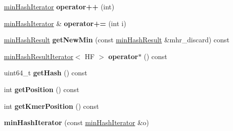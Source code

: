 \begin{DoxyCompactItemize}
\hyperlink{classminHashIterator}{min\+Hash\+Iterator} {\bfseries operator++} (int)
\item 
\mbox{\label{classminHashIterator_a27ab44b8b3ac352f5fca68e45234fa7c}} 
\hyperlink{classminHashIterator}{min\+Hash\+Iterator} \& {\bfseries operator+=} (int i)
\item 
\mbox{\label{classminHashIterator_af6011fc1ea46a7fe78b4962c9115bda4}} 
\hyperlink{structminHashResult}{min\+Hash\+Result} {\bfseries get\+New\+Min} (const \hyperlink{structminHashResult}{min\+Hash\+Result} \&mhr\+\_\+discard) const
\item 
\mbox{\label{classminHashIterator_a7084bf0158bdc1845c76edcf6bb39011}} 
\hyperlink{structminHashResultIterator}{min\+Hash\+Result\+Iterator}$<$ HF $>$ {\bfseries operator$\ast$} () const
\item 
\mbox{\label{classminHashIterator_a5c7fb3a1055ac579f705af1c690ea3f2}} 
uint64\+\_\+t {\bfseries get\+Hash} () const
\item 
\mbox{\label{classminHashIterator_a9e9471805982ccd06ba763ccba86dcb8}} 
int {\bfseries get\+Position} () const
\item 
\mbox{\label{classminHashIterator_a6c422b376378d429bbc45d2e9d5b43c9}} 
int {\bfseries get\+Kmer\+Position} () const
\item 
\mbox{\label{classminHashIterator_a29a98752a3cf55a315b3a138d7cab80c}} 
{\bfseries min\+Hash\+Iterator} (const \hyperlink{classminHashIterator}{min\+Hash\+Iterator} \&o)
\end{DoxyCompactItemize}
